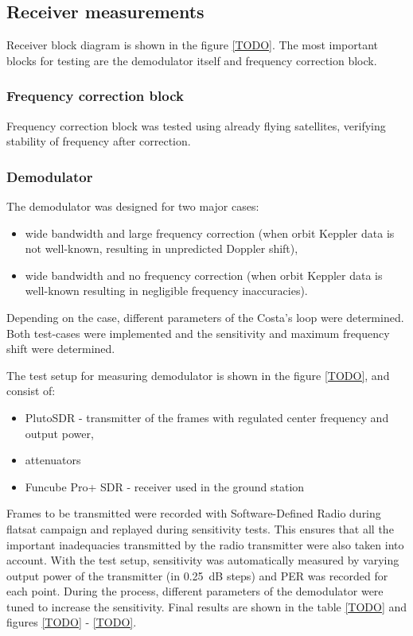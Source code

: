 \subsection{Receiver measurements}
Receiver block diagram is shown in the figure \ref{TODO}. The most important blocks for testing are the demodulator itself and frequency correction block.

\subsubsection{Frequency correction block}
Frequency correction block was tested using already flying satellites, verifying stability of frequency after correction.


\subsubsection{Demodulator}
The demodulator was designed for two major cases:
\begin{itemize}
    \item wide bandwidth and large frequency correction (when orbit Keppler data is not well-known, resulting in unpredicted Doppler shift),
    \item wide bandwidth and no frequency correction (when orbit Keppler data is well-known resulting in negligible frequency inaccuracies).
\end{itemize}

Depending on the case, different parameters of the Costa's loop were determined. Both test-cases were implemented and the sensitivity and maximum frequency shift were determined.

The test setup for measuring demodulator is shown in the figure \ref{TODO}, and consist of:
\begin{itemize}
    \item PlutoSDR - transmitter of the frames with regulated center frequency and output power,
    \item attenuators
    \item Funcube Pro+ SDR - receiver used in the ground station
\end{itemize}

Frames to be transmitted were recorded with Software-Defined Radio during flatsat campaign and replayed during sensitivity tests. This ensures that all the important inadequacies transmitted by the radio transmitter were also taken into account.
With the test setup, sensitivity was automatically measured by varying output power of the transmitter (in \SI{0.25}{\dB} steps) and PER was recorded for each point. During the process, different parameters of the demodulator were tuned to increase the sensitivity. Final results are shown in the table \ref{TODO} and figures \ref{TODO} - \ref{TODO}.

